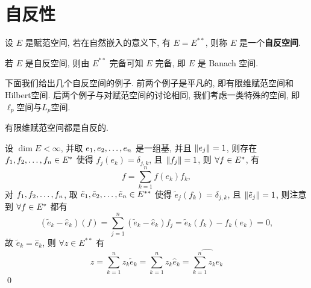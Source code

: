 \section{自反性}
    \begin{Definition}[自反空间]\label{def:自反空间}
        设 $ E $ 是赋范空间, 若在自然嵌入的意义下, 有 $ E=E^{**} $, 则称 $ E $ 是一个\textbf{自反空间}.
    \end{Definition}
    \begin{Remark}
        若 $ E $ 是自反空间, 则由 $ E^{**} $ 完备可知 $ E $ 完备, 即 $ E $ 是 Banach 空间.
    \end{Remark}

    下面我们给出几个自反空间的例子. 前两个例子是平凡的, 即有限维赋范空间和Hilbert空间. 后两个例子与对赋范空间的讨论相同, 我们考虑一类特殊的空间, 即$ \ell_p $空间与$ L_p $空间.

    \begin{Proposition}
        有限维赋范空间都是自反的.
    \end{Proposition}
    \begin{Proof}
        设 $ \dim E<\infty $, 并取 $ e_{1}, e_{2}, \dots, e_{n} $ 是一组基, 并且 $ \left\| e_{j} \right\|=1 $, 则存在 $ f_{1}, f_{2}, \dots, f_{n}\in E^{*} $ 使得 $ f_{j}(e_{k})=\delta_{j, k} $, 且 $ \left\| f_{j} \right\|=1 $, 则 $ \forall f\in E^{*} $, 有
        \[
            f=\sum_{k=1}^{n}f(e_{k})f_{k},
        \]
        对 $ f_{1}, f_{2}, \dots, f_{n} $, 取 $ \tilde{e}_{1}, \tilde{e}_{2}, \dots, \tilde{e}_{n}\in E^{**} $ 使得 $ \tilde{e}_{j}(f_{k})=\delta_{j, k} $, 且 $ \left\| \tilde{e}_{j} \right\|=1 $, 则注意到 $ \forall f\in E^{*} $ 都有
        \[
            (\tilde{e}_{k}-\hat{e}_{k})(f)=\sum_{j=1}^{n}(\tilde{e}_{k}-\hat{e}_{k})f_{j}=\tilde{e}_{k}(f_{k})-f_{k}(e_{k})=0,
        \]
        故 $ \tilde{e}_{k}=\hat{e}_{k} $, 则 $ \forall z\in E^{**} $ 有
        \[
            z=\sum_{k=1}^{n}z_{k}\tilde{e}_{k}=\sum_{k=1}^{n}z_{k}\hat{e}_{k}=\widehat{\sum_{k=1}^{n}z_{k}e_{k}}
        \]
        \qed
    \end{Proof}

